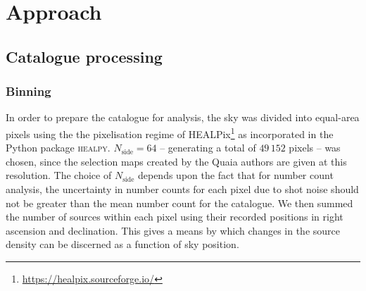 \documentclass[fleqn,usenatbib]{mnras}
\begin{document}
\section{Approach}
\label{sec:approach}
    \subsection{Catalogue processing}

    \subsubsection{Binning}
    \label{subs:binning}
        In order to prepare the catalogue for analysis, the sky was divided into equal-area pixels using the the pixelisation regime of HEALPix\footnote{\url{https://healpix.sourceforge.io/}} \citep{Gorski2005, Zonca2019} as incorporated in the Python package \textsc{healpy}. 
        $N_\text{side} = 64$ -- generating a total of $49\,152$ pixels -- was chosen, since the selection maps created by the Quaia authors are given at this resolution.
        The choice of $N_\text{side}$ depends upon the fact that for number count analysis, the uncertainty in number counts for each pixel due to shot noise should not be greater than the mean number count for the catalogue.
        We then summed the number of sources within each pixel using their recorded positions in right ascension and declination. 
        This gives a means by which changes in the source density can be discerned as a function of sky position.
\end{document}
